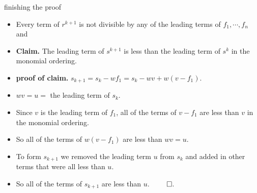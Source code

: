 \documentclass{beamer}
\begin{document}
\begin{frame}{finishing the proof}

\begin{itemize}
  \item  Every term of $r^{k+1}$ is not divisible by any of the leading terms of $f_1,\cdots, f_n$ and
  \item \textbf{Claim.} The leading term of $s^{k+1}$ is less than the leading term of $s^k$ in the monomial ordering.
  \item \textbf{proof of claim.}  $s_{k+1} = s_k - wf_1 = s_k - wv + w(v - f_1)$.
  \item $wv = u = $ the leading term of $s_k$.
  \item Since $v$ is the leading term of $f_1$, all of the terms of $v -f_1$ are less than $v$ in the monomial ordering.
  \item So all of the terms of $w(v-f_1)$ are less than $wv = u$.
  \item To form $s_{k+1}$ we removed the leading term $u$ from $s_k$ and added in other terms that were all less than $u$.
  \item So all of the terms of $s_{k+1}$ are less than $u$. $\qed$.
\end{itemize}
\end{frame}

\end{document}
